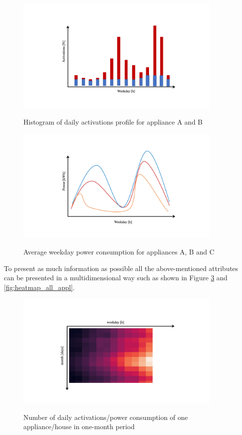 \begin{figure}[H]
	\centering
	\caption{Histogram of daily activations profile for appliance A and B}
	\includegraphics[width=0.9\textwidth]{Figures/profile_sketches/Slide8.png}
	\label{fig:daily_act_m_profile}
\end{figure}
\begin{figure}[H]
	\centering
	\caption{Average weekday power consumption for appliances A, B and C}
	\includegraphics[width=0.9\textwidth]{Figures/profile_sketches/Slide2.png}
	\label{fig:daily_power_m_profile}
\end{figure}

To present as much information as possible all the above-mentioned attributes 
can be presented in a multidimensional way such as shown in Figure \ref{fig:heatmap_2dtime} and \ref{fig:heatmap_all_appl}.

\begin{figure}[H]
	\centering
	\caption{Number of daily activations/power consumption of one appliance/house in one-month period}
	\includegraphics[width=0.9\textwidth]{Figures/profile_sketches/Slide10.png}
	\label{fig:heatmap_2dtime}
\end{figure}

